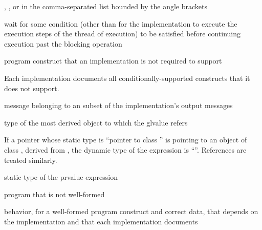 %
%
,
, or
 in the comma-separated
list bounded by the angle brackets

%
wait for some condition (other than for the implementation to execute
the execution steps of the thread of execution) to be satisfied before
continuing execution past the blocking operation

%
program construct that an implementation is not required to support

\begin{defnote}
Each implementation documents all conditionally-supported
constructs that it does not support.
\end{defnote}

%
message belonging to an  subset of the
implementation's output messages

%
 type of the most derived object to which the
glvalue refers

\begin{example}
If a pointer  whose static type is ``pointer to
class '' is pointing to an object of class , derived
from , the dynamic type of the
expression  is ``''. References are
treated similarly.
\end{example}

%
 static type of the prvalue expression

%
program that is not well-formed

%
behavior, for a well-formed program construct and correct data, that
depends on the implementation and that each implementation documents

